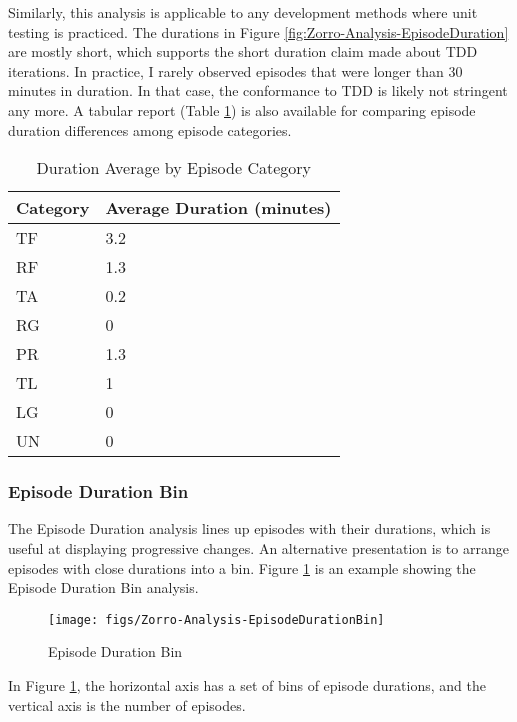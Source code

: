 Similarly, this analysis is applicable to any development methods 
where unit testing is practiced.  The durations in Figure 
\ref{fig:Zorro-Analysis-EpisodeDuration} are mostly short, which
supports the short duration claim made about TDD iterations. In 
practice, I rarely observed episodes that were longer than 30 minutes
in duration. In that case, the conformance to TDD is likely not 
stringent any more. A tabular report 
(Table \ref{tab:Zorro-Analysis-EpisodeDurationTable}) is also 
available for comparing episode duration differences among 
episode categories. 
\begin{table}[htbp]
\centering
  \caption{Duration Average by Episode Category}
  \begin{tabular}{|l|l|} \hline 
  Category  &   Average Duration (minutes) \\ \hline
  TF    & 3.2 \\ \hline
  RF    & 1.3 \\ \hline
  TA    & 0.2 \\ \hline
  RG    & 0   \\ \hline
  PR    & 1.3 \\ \hline
  TL    & 1  \\ \hline
  LG    & 0  \\ \hline
  UN    & 0 \\ \hline
  \end{tabular}
  \label{tab:Zorro-Analysis-EpisodeDurationTable}
\end{table}
 
\subsubsection{Episode Duration Bin}
The Episode Duration analysis lines up episodes with their 
durations, which is useful at displaying progressive changes. 
An alternative presentation is to arrange episodes with
close durations into a bin. Figure 
\ref{fig:Zorro-Analysis-EpisodeDurationBin} is an example
showing the Episode Duration Bin analysis. 
\begin{figure}[htbp]
  \centering
  \texttt{[image: figs/Zorro-Analysis-EpisodeDurationBin]}
  \caption{Episode Duration Bin}
  \label{fig:Zorro-Analysis-EpisodeDurationBin}
\end{figure}
In Figure \ref{fig:Zorro-Analysis-EpisodeDurationBin}, the horizontal 
axis has a set of bins of episode durations, and the vertical axis 
is the number of episodes. 

